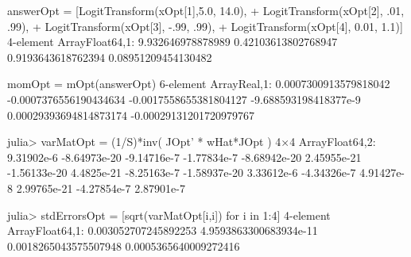 answerOpt = [LogitTransform(xOpt[1],5.0, 14.0),
+          LogitTransform(xOpt[2], .01, .99),
+          LogitTransform(xOpt[3], -.99, .99),
+          LogitTransform(xOpt[4], 0.01, 1.1)]
4-element Array{Float64,1}:
 9.932646978878989  
 0.42103613802768947
 0.9193643618762394 
 0.08951209454130482

momOpt = mOpt(answerOpt)
6-element Array{Real,1}:
  0.0007300913579818042 
 -0.0007376556190434634 
 -0.0017558655381804127 
 -9.688593198418377e-9  
  0.00029393694814873174
 -0.00029131201720979767

julia> varMatOpt = (1/S)*inv( JOpt' * wHat*JOpt )
4×4 Array{Float64,2}:
  9.31902e-6   -8.64973e-20  -9.14716e-7   -1.77834e-7
 -8.68942e-20   2.45955e-21  -1.56133e-20   4.4825e-21
 -8.25163e-7   -1.58937e-20   3.33612e-6   -4.34326e-7
  4.91427e-8    2.99765e-21  -4.27854e-7    2.87901e-7

julia> stdErrorsOpt = [sqrt(varMatOpt[i,i]) for i in 1:4]
4-element Array{Float64,1}:
 0.003052707245892253  
 4.9593863300683934e-11
 0.0018265043575507948 
 0.0005365640009272416 